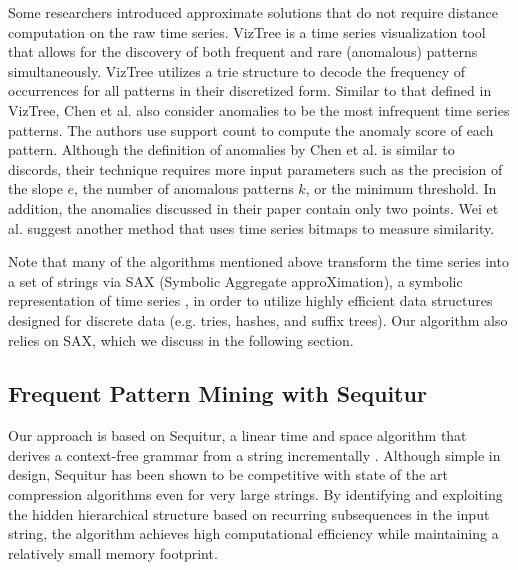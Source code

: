 \documentclass{llncs}
\begin{document}
Some researchers introduced approximate solutions that do not require distance computation on the raw time series. VizTree \cite{viztree} is a time series visualization tool that allows for the discovery of both frequent and rare (anomalous) patterns simultaneously. VizTree utilizes a trie structure to decode the frequency of occurrences for all patterns in their discretized form. Similar to that defined in VizTree, Chen et al.\cite{ano_pattern} also consider anomalies to be the most infrequent time series patterns. The authors use support count to compute the anomaly score of each pattern. Although the definition of anomalies by Chen et al. is similar to discords, their technique requires more input parameters such as the precision of the slope $e$, the number of anomalous patterns $k$, or the minimum threshold. In addition, the anomalies discussed in their paper contain only two points. Wei et al. \cite{bitmaps} suggest another method that uses time series bitmaps to measure similarity. 

Note that many of the algorithms mentioned above \cite{hot_sax, viztree, bitmaps, haar_1, haar_2} transform the time series into a set of strings via SAX (Symbolic Aggregate approXimation), a symbolic representation of time series \cite{sax}, in order to utilize highly efficient data structures designed for discrete data (e.g. tries, hashes, and suffix trees). Our algorithm also relies on SAX, which we discuss in the following section.

\subsection{Frequent Pattern Mining with Sequitur}
Our approach is based on Sequitur, a linear time and space algorithm that derives a context-free grammar from a string incrementally \cite{sequitur}. Although simple in design, Sequitur has been shown to be competitive with state of the art compression algorithms even for very large strings. By identifying and exploiting the hidden hierarchical structure based on recurring subsequences in the input string, the algorithm achieves high computational efficiency while maintaining a relatively small memory footprint. 

\end{document}
